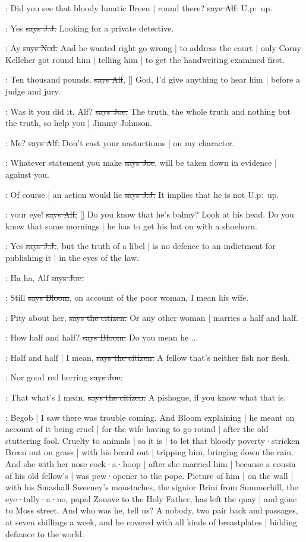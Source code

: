 \bergan:
Did you see that bloody lunatic Breen |
round there?
\sout{says Alf.}
U.p:~up.

\jjom:
Yes
\sout{says J.J.}
Looking for a private detective.

\lambert:
Ay
\sout{says Ned.}
And he wanted right go wrong |
to address the court |
only Corny Kelleher got round him |
telling him |
to get the handwriting examined first.

\bergan:
Ten thousand pounds.
\sout{says Alf},
[]
God,
I'd give anything to hear him |
before a judge and jury.

\joe:
Was it you did it,
Alf?
\sout{says Joe.}
The truth,
the whole truth and nothing but the truth,
so help you |
Jimmy Johnson.

\bergan:
Me?
\sout{says Alf.}
Don't cast your nasturtiums |
on my character.

\joe:
Whatever statement you make
\sout{says Joe},
will be taken down in evidence |
against you.

\jjom:
Of course |
an action would lie
\sout{says J.J.}
It implies that he is not 
U.p:~up.

\bergan:
 your eye!
\sout{says Alf,}
[]
Do you know that he's balmy?
Look at his head.
Do you know that some mornings |
he has to get his hat on with a shoehorn.

\jjom:
Yes
\sout{says J.J.},
but the truth of a libel |
is no defence to an indictment for publishing it |
in the eyes of the law.

\joe:
Ha ha,
Alf
\sout{says Joe.}

\Bloom:
Still
\sout{says Bloom},
on account of the poor woman,
I mean his wife.

\citizen:
Pity about her,
\sout{says the citizen.}
Or any other woman |
marries a half and half.

\Bloom:
How half and half?
\sout{says Bloom.}
Do you mean he ...

\citizen:
Half and half |
I mean,
\sout{says the citizen.}
A fellow that's neither fish nor flesh.

\joe:
Nor good red herring
\sout{says Joe.}

\citizen:
That what's I mean,
\sout{says the citizen.}
A pishogue,
if you know what that is.

\Nq:
Begob |
I saw there was trouble coming.
And Bloom explaining |
he meant on account of it being cruel |
for the wife having to go round |
after the old stuttering fool.
Cruelty to animals |
so it is |
to let that bloody poverty·stricken Breen out on grass |
with his beard out |
tripping him,
bringing down the rain.
And she with her nose cock·a·hoop |
after she married him |
because a cousin of his old fellow's |
was pew·opener to the pope.
Picture of him |
on the wall |
with his Smashall Sweeney's moustaches,
the signior Brini from Summerhill,
the eye·tally·a·no,
papal Zouave to the Holy Father,
has left the quay |
and gone to Moss street.
And who was he,
tell us?
A nobody,
two pair back and passages,
at seven shillings a week,
and he covered with all kinds of breastplates
 |
bidding defiance to the world.

